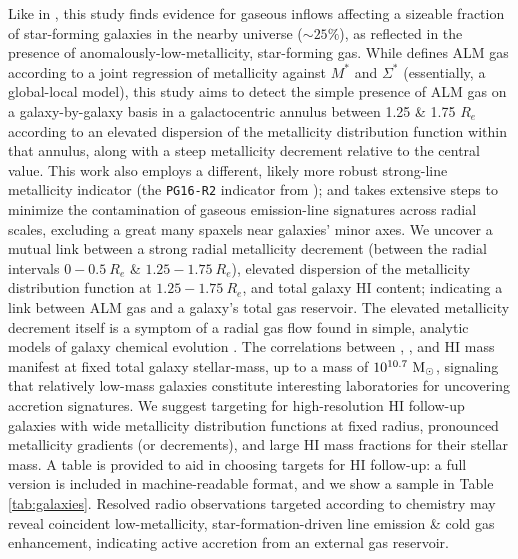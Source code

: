 Like in \citet{hwang_2019_manga_almrs}, this study finds evidence for gaseous inflows affecting a sizeable fraction of star-forming galaxies in the nearby universe ($\sim 25\%$), as reflected in the presence of anomalously-low-metallicity, star-forming gas. While \citet{hwang_2019_manga_almrs} defines ALM gas according to a joint regression of metallicity against $M^*$ and $\Sigma^*$ (essentially, a global-local model), this study aims to detect the simple presence of ALM gas on a galaxy-by-galaxy basis in a galactocentric annulus between 1.25 \& 1.75 $R_e$ according to an elevated dispersion of the metallicity distribution function within that annulus, along with a steep metallicity decrement relative to the central value. This work also employs a different, likely more robust strong-line metallicity indicator (the \texttt{PG16-R2} indicator from \citealt{pilyugin_grebel_2016}); and takes extensive steps to minimize the contamination of gaseous emission-line signatures across radial scales, excluding a great many spaxels near galaxies' minor axes. We uncover a mutual link between a strong radial metallicity decrement (between the radial intervals $0-0.5 ~ R_e$ \& $1.25-1.75 ~ R_e$), elevated dispersion of the metallicity distribution function at $1.25-1.75 ~ R_e$, and total galaxy HI content; indicating a link between ALM gas and a galaxy's total gas reservoir. The elevated metallicity decrement itself is a symptom of a radial gas flow found in simple, analytic models of galaxy chemical evolution \citep{pezzulli_fraternali_2015}. The correlations between \metdec, \metdisp, and HI mass manifest at fixed total galaxy stellar-mass, up to a mass of $10^{10.7} ~ {\rm M_{\odot}}$, signaling that relatively low-mass galaxies constitute interesting laboratories for uncovering accretion signatures. We suggest targeting for high-resolution HI follow-up galaxies with wide metallicity distribution functions at fixed radius, pronounced metallicity gradients (or decrements), and large HI mass fractions for their stellar mass. A table is provided to aid in choosing targets for HI follow-up: a full version is included in machine-readable format, and we show a sample in Table \ref{tab:galaxies}. Resolved radio observations targeted according to chemistry may reveal coincident low-metallicity, star-formation-driven line emission \& cold gas enhancement, indicating active accretion from an external gas reservoir.